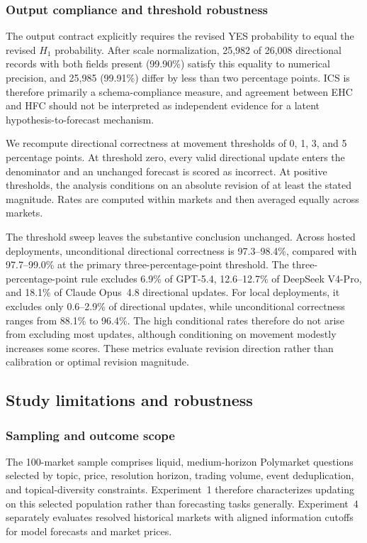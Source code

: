 \subsubsection{Output compliance and threshold robustness}
\label{app:exp1-threshold-robustness}

The output contract explicitly requires the revised YES probability to equal the revised $H_1$ probability.
After scale normalization, 25,982 of 26,008 directional records with both fields present (99.90\%) satisfy this equality to numerical precision, and 25,985 (99.91\%) differ by less than two percentage points.
ICS is therefore primarily a schema-compliance measure, and agreement between EHC and HFC should not be interpreted as independent evidence for a latent hypothesis-to-forecast mechanism.

We recompute directional correctness at movement thresholds of 0, 1, 3, and 5 percentage points.
At threshold zero, every valid directional update enters the denominator and an unchanged forecast is scored as incorrect.
At positive thresholds, the analysis conditions on an absolute revision of at least the stated magnitude.
Rates are computed within markets and then averaged equally across markets.

The threshold sweep leaves the substantive conclusion unchanged.
Across hosted deployments, unconditional directional correctness is 97.3--98.4\%, compared with 97.7--99.0\% at the primary three-percentage-point threshold.
The three-percentage-point rule excludes 6.9\% of GPT-5.4, 12.6--12.7\% of DeepSeek V4-Pro, and 18.1\% of Claude Opus~4.8 directional updates.
For local deployments, it excludes only 0.6--2.9\% of directional updates, while unconditional correctness ranges from 88.1\% to 96.4\%.
The high conditional rates therefore do not arise from excluding most updates, although conditioning on movement modestly increases some scores.
These metrics evaluate revision direction rather than calibration or optimal revision magnitude.

\subsection{Study limitations and robustness}
\label{app:exp1-limitations}

\subsubsection{Sampling and outcome scope}

The 100-market sample comprises liquid, medium-horizon Polymarket questions selected by topic, price, resolution horizon, trading volume, event deduplication, and topical-diversity constraints.
Experiment~1 therefore characterizes updating on this selected population rather than forecasting tasks generally.
Experiment~4 separately evaluates resolved historical markets with aligned information cutoffs for model forecasts and market prices.

